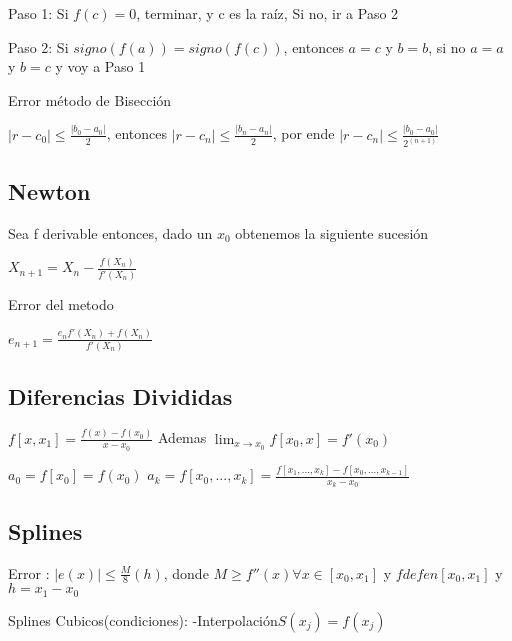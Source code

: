 \documentclass{article}
\begin{document}
Paso 1: Si $f(c) = 0 $, terminar, y c es la raíz, Si no, ir a Paso 2

Paso 2: Si $signo(f(a)) = signo(f(c))$, entonces $a = c$ y $b = b$, si no $a = a$ y $b = c$ y voy a Paso 1

  \vspace{5mm}

Error método de Bisección

$|r - c_0| \leq \frac{|b_0 - a_0|}{2}$, entonces $|r-c_n| \leq \frac{|b_n - a_n|}{2}$, por ende $|r-c_n| \leq \frac{|b_0 - a_0|}{2^{(n+1)}}$ 

\vspace{5mm}

\subsection{Newton}\label{Newton}

Sea f derivable entonces, dado un $x_0$ obtenemos la siguiente sucesión

$X_{n+1} = X_n - \frac{f(X_n)}{f'(X_n)}$

Error del metodo

$e_{n+1} = \frac{e_nf'(X_n)+f(X_n)}{f'(X_n)}$


\vspace{5mm}

\subsection{Diferencias Divididas}\label{Diferencias-Divididas}


$f[x,x_1] =\frac{f(x)-f(x_0)}{x-x_0}$ Ademas $\lim_{x \to x_0}f[x_0,x] = f'(x_0)$

\vspace{5mm}

$a_0 = f[x_0] = f(x_0)$
$a_k = f[x_0,...,x_k] = \frac{f[x_1,...,x_k]-f[x_0,...,x_{k-1}]}{x_k-x_0}$


\vspace{5mm}

\subsection{Splines}\label{Splines}

Error : $|e(x)| \leq \frac{M}{8}(h)$, donde $M \geq f''(x) \forall x \in [x_0,x_1]$ y $f def en [x_0,x_1]$ y $h =x_1-x_0$


\vspace{5mm}

Splines Cubicos(condiciones):
-Interpolación$S(x_j) = f(x_j)$
\end{document}
